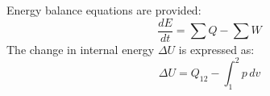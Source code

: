 Energy balance equations are provided:  
\[
\frac{dE}{dt} = \sum Q - \sum W
\]  
The change in internal energy \( \Delta U \) is expressed as:  
\[
\Delta U = Q_{12} - \int_{1}^{2} p \, dv
\]